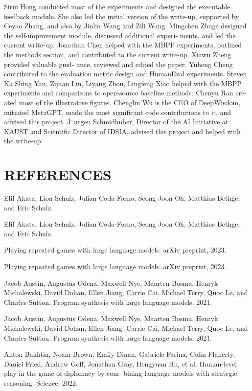 \documentclass[12pt]{article}
\begin{document}
Sirui Hong conducted most of the experiments and designed the executable feedback module. She
also led the initial version of the write-up, supported by Ceyao Zhang, and also by Jinlin Wang and
Zili Wang. Mingchen Zhuge designed the self-improvement module, discussed additional experi-
ments, and led the current write-up. Jonathan Chen helped with the MBPP experiments, outlined
the methods section, and contributed to the current write-up. Xiawu Zheng provided valuable guid-
ance, reviewed and edited the paper. Yuheng Cheng contributed to the evaluation metric design and
HumanEval experiments. Steven Ka Shing Yau, Zijuan Lin, Liyang Zhou, Lingfeng Xiao helped
with the MBPP experiments and comparisons to open-source baseline methods. Chenyu Ran cre-
ated most of the illustrative figures. Chenglin Wu is the CEO of DeepWisdom, initiated MetaGPT,
made the most significant code contributions to it, and advised this project. J¨urgen Schmidhuber,
Director of the AI Initiative at KAUST and Scientific Director of IDSIA, advised this project and
helped with the write-up.


\section{REFERENCES}


Elif Akata, Lion Schulz, Julian Coda-Forno, Seong Joon Oh, Matthias Bethge, and Eric Schulz.


Elif Akata, Lion Schulz, Julian Coda-Forno, Seong Joon Oh, Matthias Bethge, and Eric Schulz.


Playing repeated games with large language models. arXiv preprint, 2023.


Playing repeated games with large language models. arXiv preprint, 2023.


Jacob Austin, Augustus Odena, Maxwell Nye, Maarten Bosma, Henryk Michalewski, David Dohan,
Ellen Jiang, Carrie Cai, Michael Terry, Quoc Le, and Charles Sutton. Program synthesis with large
language models, 2021.


Jacob Austin, Augustus Odena, Maxwell Nye, Maarten Bosma, Henryk Michalewski, David Dohan,
Ellen Jiang, Carrie Cai, Michael Terry, Quoc Le, and Charles Sutton. Program synthesis with large
language models, 2021.


Anton Bakhtin, Noam Brown, Emily Dinan, Gabriele Farina, Colin Flaherty, Daniel Fried, Andrew
Goff, Jonathan Gray, Hengyuan Hu, et al. Human-level play in the game of diplomacy by com-
bining language models with strategic reasoning. Science, 2022.
\end{document}
